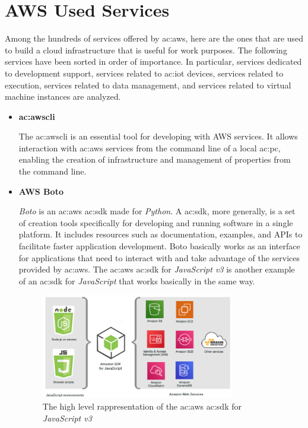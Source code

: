 \section{AWS Used Services}
Among the hundreds of services offered by \gls{ac:aws}, here are the ones that are used to build a cloud infrastructure that is useful for work purposes. The following services have been sorted in order of importance. In particular, services dedicated to development support, services related to \gls{ac:iot} devices, services related to execution, services related to data management, and services related to virtual machine instances are analyzed.
\begin{itemize}
    \item[] \textbf{\gls{ac:awscli}} 
    
    The \gls{ac:awscli} is an essential tool for developing with AWS services. It allows interaction with \gls{ac:aws} services from the command line of a local \gls{ac:pc}, enabling the creation of infrastructure and management of properties from the command line.
    
    \item[] \textbf{AWS Boto} 
    
    \textit{Boto} is an \gls{ac:aws} \gls{ac:sdk} made for \textit{Python}. A \gls{ac:sdk}, more generally, is a set of creation tools specifically for developing and running software in a single platform. It includes resources such as documentation, examples, and APIs to facilitate faster application development. Boto basically works as an interface for applications that need to interact with and take advantage of the services provided by \gls{ac:aws}. The \gls{ac:aws} \gls{ac:sdk} for \textit{JavaScript v3} is another example of an \gls{ac:sdk} for \textit{JavaScript} that works basically in the same way.
    \begin{figure}[h]  %
        \centering
        \includegraphics[width=0.8\textwidth]{images/AWSSDK.png}  %
        \caption{The high level rappresentation of the \gls{ac:aws} \gls{ac:sdk} for \textit{JavaScript v3} \cite{AWSSDK}}
        \label{fig:AWSSDK}
    \end{figure}
    

\end{itemize}
